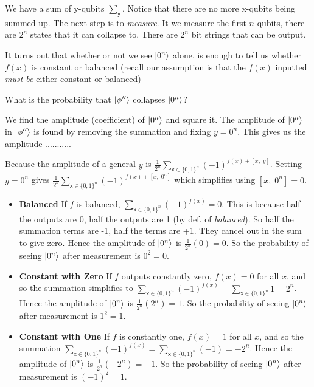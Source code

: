 We have a sum of y-qubits $\sum_{\textsf{y}}$. 
Notice that there are no more x-qubits being summed up.
The next step is to \textit{measure}. 
It we measure the first $n$ qubits, there are $2^n$ states that it can collapse to. 
There are $2^n$ bit strings that can be output. 

It turns out that whether or not we see $\left|0^n\right\rangle$ alone, is enough to
tell us whether $f(x)$ is constant or balanced
(recall our assumption is that the $f(x)$ inputted \textit{must be} either 
constant or balanced)


\frmrule

\begin{example}
What is the probability that $\left|\phi''\right\rangle$ collapses $\left|0^n\right\rangle$?

We find the amplitude (coefficient) of $\left|0^n\right\rangle$ and square it. 
The amplitude of $\left|0^n\right\rangle$ in $\left|\phi''\right\rangle$ is found by removing the summation and 
fixing $y = 0^n$. This gives us the amplitude ...........


Because the amplitude of a general 
$y$ is $\frac{1}{2^n} \sum_{\textsf{x} \in \{0,1\}^n} (-1)^{f(x)+[x,\;y]}$.
Setting $y = 0^n$ gives $\frac{1}{2^n} \sum_{\textsf{x} \in \{0,1\}^n} (-1)^{f(x)+[x,\;0^n]}$
which simplifies using $[x,\;0^n] = 0$.

\end{example}


\begin{itemize}   
\renewcommand{\labelitemi}{$\Box$}
\item \textbf{Balanced}
If $f$ is balanced, $\sum_{\textsf{x} \in \{0,1\}^n} (-1)^{f(x)} = 0$. This is because 
half the outputs are 0, half the outputs are 1 (by def. of \textit{balanced}). 
So half the summation terms are -1, half the terms are +1. 
They cancel out in the sum to give zero. Hence the amplitude of $\left|0^n\right\rangle$ is $\frac{1}{2^n}(0) = 0$.
So the probability of seeing $\left|0^n\right\rangle$ after measurement is $0^2 = 0$.
\item \textbf{Constant with Zero} 
If $f$ outputs constantly zero, $f(x) = 0$ for all $x$, and so the summation simplifies to
$\sum_{\textsf{x} \in \{0,1\}^n} (-1)^{f(x)} = \sum_{\textsf{x} \in \{0,1\}^n} 1 = 2^n$. 
Hence the amplitude of $\left|0^n\right\rangle$ is $\frac{1}{2^n}(2^n) = 1$.
So the probability of seeing $\left|0^n\right\rangle$ after measurement is $1^2 = 1$.
\item \textbf{Constant with One}
If $f$ is constantly one, $f(x) = 1$ for all $x$, and so the summation 
$\sum_{\textsf{x} \in \{0,1\}^n} (-1)^{f(x)} = \sum_{\textsf{x} \in \{0,1\}^n} (-1) = -2^n$.
Hence the amplitude of $\left|0^n\right\rangle$ is $\frac{1}{2^n}(-2^n) = -1$.
So the probability of seeing $\left|0^n\right\rangle$ after measurement is $(-1)^2 = 1$.
\end{itemize}

